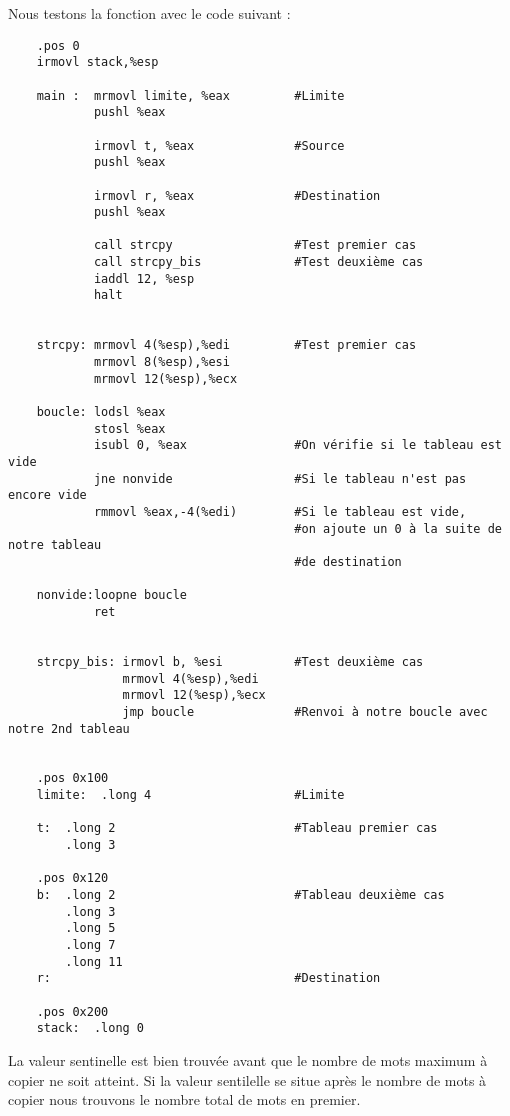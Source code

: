 \documentclass[a4paper,10pt]{article}
\begin{document}
Nous testons la fonction avec le code suivant :
\begin{verbatim}
    .pos 0
    irmovl stack,%esp

    main :  mrmovl limite, %eax         #Limite
            pushl %eax

            irmovl t, %eax              #Source
            pushl %eax

            irmovl r, %eax              #Destination
            pushl %eax

            call strcpy                 #Test premier cas
            call strcpy_bis             #Test deuxième cas
            iaddl 12, %esp
            halt


    strcpy: mrmovl 4(%esp),%edi         #Test premier cas
            mrmovl 8(%esp),%esi
            mrmovl 12(%esp),%ecx

    boucle: lodsl %eax
            stosl %eax
            isubl 0, %eax               #On vérifie si le tableau est vide
            jne nonvide                 #Si le tableau n'est pas encore vide
            rmmovl %eax,-4(%edi)        #Si le tableau est vide,
                                        #on ajoute un 0 à la suite de notre tableau
                                        #de destination

    nonvide:loopne boucle
            ret


    strcpy_bis: irmovl b, %esi          #Test deuxième cas
                mrmovl 4(%esp),%edi
                mrmovl 12(%esp),%ecx
                jmp boucle              #Renvoi à notre boucle avec notre 2nd tableau


    .pos 0x100
    limite:  .long 4                    #Limite

    t:  .long 2                         #Tableau premier cas
        .long 3

    .pos 0x120
    b:  .long 2                         #Tableau deuxième cas
        .long 3
        .long 5
        .long 7
        .long 11
    r:                                  #Destination

    .pos 0x200
    stack:  .long 0

\end{verbatim}
La valeur sentinelle est bien trouvée avant que le nombre de mots maximum à copier ne soit atteint. Si la valeur sentilelle se situe après le nombre de mots à copier nous trouvons le nombre total de mots en premier.
\end{document}
